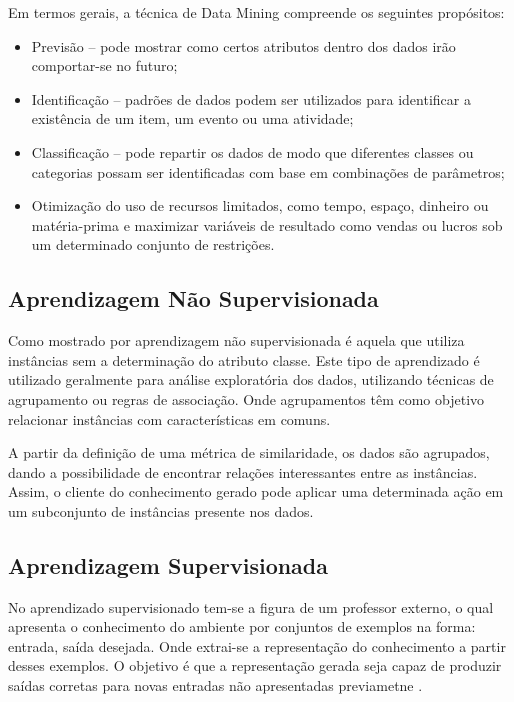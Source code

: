 \documentclass[
	12pt,				%
	openright,			%
	oneside,	
	a4paper,				%
	english,				%
	brazil				%
]{abntex2/abntex2} %
\begin{document}
		Em termos gerais, a técnica de Data Mining compreende os seguintes propósitos:
		
		\begin{itemize}
			\item Previsão – pode mostrar como certos atributos dentro dos dados irão comportar-se no futuro;
			\item Identificação – padrões de dados podem ser utilizados para identificar a existência de um item, um evento ou uma atividade;
			\item Classificação – pode repartir os dados de modo que diferentes classes ou categorias possam ser identificadas com base em combinações de parâmetros;
			\item Otimização do uso de recursos limitados, como tempo, espaço, dinheiro ou matéria-prima e maximizar variáveis de resultado como vendas ou lucros sob um determinado conjunto de restrições.
		\end{itemize}
		
	\subsection{Aprendizagem Não Supervisionada}
	
		Como mostrado por \cite{damasceno:2005} aprendizagem não supervisionada é aquela que utiliza instâncias sem a determinação do atributo classe. Este  tipo de aprendizado é utilizado geralmente para análise exploratória dos dados, utilizando técnicas de  agrupamento ou regras de associação. Onde agrupamentos têm como objetivo relacionar instâncias com características em comuns.
		
		A partir da definição de uma métrica de similaridade, os dados são  agrupados, dando a possibilidade de encontrar relações interessantes entre as instâncias. Assim, o cliente do conhecimento gerado pode aplicar uma determinada ação em um subconjunto de instâncias presente nos  dados. 
		
	\subsection{Aprendizagem Supervisionada}
	
	No aprendizado supervisionado tem-se a figura de um professor externo, o qual apresenta o conhecimento do ambiente por conjuntos de exemplos na forma: entrada, saída desejada. Onde extrai-se a representação do conhecimento a partir desses exemplos. O objetivo é que a representação gerada seja capaz de produzir saídas corretas para novas entradas não apresentadas previametne \cite{lorena:2007}.
	
\end{document}
